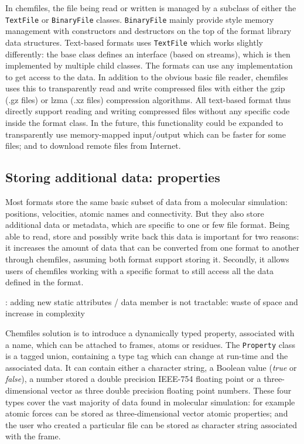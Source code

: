 \documentclass[thesis]{subfiles}
\begin{document}
In chemfiles, the file being read or written is managed by a subclass of either
the \texttt{TextFile} or \texttt{BinaryFile} classes. \texttt{BinaryFile} mainly
provide \cxx style memory management with constructors and destructors on the
top of the format library data structures. Text-based formats uses
\texttt{TextFile} which works slightly differently: the base class defines an
interface (based on \cxx streams), which is then implemented by multiple child
classes. The formats can use any implementation to get access to the data. In
addition to the obvious basic file reader, chemfiles uses this to transparently
read and write compressed files with either the gzip (.gz files) or lzma (.xz
files) compression algorithms. All text-based format thus directly support
reading and writing compressed files without any specific code inside the format
class. In the future, this functionality could be expanded to transparently use
memory-mapped input/output which can be faster for some files; and to download
remote files from Internet.

\subsection{Storing additional data: properties}

Most formats store the same basic subset of data from a molecular simulation:
positions, velocities, atomic names and connectivity. But they also store
additional data or metadata, which are specific to one or few file format. Being
able to read, store and possibly write back this data is important for two
reasons: it increases the amount of data that can be converted from one format
to another through chemfiles, assuming both format support storing it. Secondly,
it allows users of chemfiles working with a specific format to still access all
the data defined in the format.

\TODO: adding new static attributes / data member is not tractable: waste of
space and increase in complexity

Chemfiles solution is to introduce a dynamically typed property, associated with
a name, which can be attached to frames, atoms or residues. The
\texttt{Property} class is a tagged union, containing a type tag which can
change at run-time and the associated data. It can contain either a character
string, a Boolean value (\emph{true} or \emph{false}), a number stored a double
precision IEEE-754 floating point or a three-dimensional vector as three double
precision floating point numbers. These four types cover the vast majority of
data found in molecular simulation: for example atomic forces can be stored as
three-dimensional vector atomic properties; and the user who created a
particular file can be stored as character string associated with the frame.
\end{document}
